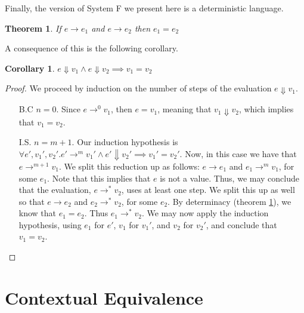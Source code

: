 \documentclass[a4paper, 11pt]{report}
\newtheorem{theorem}{Theorem}
\newtheorem{corollary}{Corollary}[theorem]
\theoremstyle{definition}
\newcommand{\expr}{e}
\newcommand{\val}{v}
\newcommand{\step}{\rightarrow}
\newcommand{\stepS}{\rightarrow^*}
\begin{document}
Finally, the version of System F we present here is a deterministic language.
\begin{theorem}\label{thm:determinacy}
  If $\expr \step \expr_1$ and $\expr \step \expr_2$ then $\expr_1 = \expr_2$
\end{theorem}
A consequence of this is the following corollary.
\begin{corollary}\label{cor:determinacy_val}
  $\expr \Downarrow \val_1 \land \expr \Downarrow \val_2 \implies \val_1 = \val_2$
\end{corollary}
\begin{proof}
  We proceed by induction on the number of steps of the evaluation $\expr \Downarrow \val_1$.
  \begin{itemize}
    \item[B.C] $n = 0$. Since $\expr \step^0 \val_1$, then $\expr = \val_1$, meaning that $\val_1 \Downarrow \val_2$, which implies that $\val_1 = \val_2$.

    \item[I.S.] $n = m + 1$. Our induction hypothesis is $\forall \expr', \val_1', \val_2' . \expr' \step^m \val_1' \land \expr' \Downarrow \val_2' \implies \val_1' = \val_2'$.
    Now, in this case we have that $\expr \step^{m + 1} \val_1$. We split this reduction up as follows: $\expr \step \expr_1$ and $\expr_1 \step^m \val_1$, for some $\expr_1$. Note that this implies that $\expr$ is not a value. Thus, we may conclude that the evaluation, $\expr \stepS \val_2$, uses at least one step. We split this up as well so that $\expr \step \expr_2$ and $\expr_2 \stepS \val_2$, for some $\expr_2$. By determinacy (theorem \ref{thm:determinacy}), we know that $\expr_1 = \expr_2$. Thus $\expr_1 \stepS \val_2$. We may now apply the induction hypothesis, using $\expr_1$ for $\expr'$, $\val_1$ for $\val_1'$, and $\val_2$ for $\val_2'$, and conclude that $\val_1 = \val_2$.
  \end{itemize}
\end{proof}


\chapter{Contextual Equivalence}
\label{ch:CE}
\end{document}
